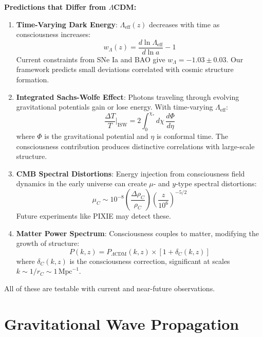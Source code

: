 \begin{level2}
\textbf{Predictions that Differ from $\Lambda$CDM:}

\begin{enumerate}
\item \textbf{Time-Varying Dark Energy}: $\Lambda_{\text{eff}}(z)$ decreases with time as consciousness increases:
\begin{equation}
w_{\Lambda}(z) = \frac{d\ln\Lambda_{\text{eff}}}{d\ln a} - 1
\end{equation}
Current constraints from SNe Ia and BAO give $w_{\Lambda} = -1.03 \pm 0.03$. Our framework predicts small deviations correlated with cosmic structure formation.

\item \textbf{Integrated Sachs-Wolfe Effect}: Photons traveling through evolving gravitational potentials gain or lose energy. With time-varying $\Lambda_{\text{eff}}$:
\begin{equation}
\frac{\Delta T}{T}\Big|_{\text{ISW}} = 2\int_0^{\chi_*} d\chi \, \frac{d\Phi}{d\eta}
\end{equation}
where $\Phi$ is the gravitational potential and $\eta$ is conformal time. The consciousness contribution produces distinctive correlations with large-scale structure.

\item \textbf{CMB Spectral Distortions}: Energy injection from consciousness field dynamics in the early universe can create $\mu$- and $y$-type spectral distortions:
\begin{equation}
\mu_C \sim 10^{-8} \left( \frac{\Delta \rho_C}{\rho_C} \right) \left( \frac{z}{10^6} \right)^{-5/2}
\end{equation}
Future experiments like PIXIE may detect these.

\item \textbf{Matter Power Spectrum}: Consciousness couples to matter, modifying the growth of structure:
\begin{equation}
P(k, z) = P_{\Lambda\text{CDM}}(k,z) \times \left[ 1 + \delta_{C}(k,z) \right]
\end{equation}
where $\delta_C(k,z)$ is the consciousness correction, significant at scales $k \sim 1/r_C \sim 1 \, \text{Mpc}^{-1}$.
\end{enumerate}

All of these are testable with current and near-future observations.
\end{level2}

\section{Gravitational Wave Propagation}

